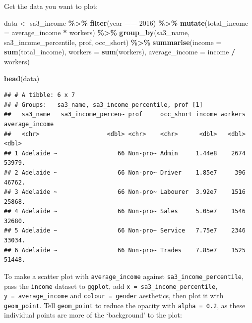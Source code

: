 \documentclass[
]{book}
\newenvironment{Shaded}{\begin{snugshade}}{\end{snugshade}}
\newcommand{\DataTypeTok}[1]{\textcolor[rgb]{0.13,0.29,0.53}{#1}}
\newcommand{\DecValTok}[1]{\textcolor[rgb]{0.00,0.00,0.81}{#1}}
\newcommand{\KeywordTok}[1]{\textcolor[rgb]{0.13,0.29,0.53}{\textbf{#1}}}
\newcommand{\NormalTok}[1]{#1}
\newcommand{\OperatorTok}[1]{\textcolor[rgb]{0.81,0.36,0.00}{\textbf{#1}}}
\newcommand{\StringTok}[1]{\textcolor[rgb]{0.31,0.60,0.02}{#1}}
\begin{document}
Get the data you want to plot:

\begin{Shaded}
\begin{Highlighting}[]
\NormalTok{data \textless{}{-}}\StringTok{ }\NormalTok{sa3\_income }\OperatorTok{\%\textgreater{}\%}\StringTok{ }
\StringTok{  }\KeywordTok{filter}\NormalTok{(year }\OperatorTok{==}\StringTok{ }\DecValTok{2016}\NormalTok{) }\OperatorTok{\%\textgreater{}\%}
\StringTok{  }\KeywordTok{mutate}\NormalTok{(}\DataTypeTok{total\_income =}\NormalTok{ average\_income }\OperatorTok{*}\StringTok{ }\NormalTok{workers) }\OperatorTok{\%\textgreater{}\%}\StringTok{ }
\StringTok{  }\KeywordTok{group\_by}\NormalTok{(sa3\_name, sa3\_income\_percentile, prof, occ\_short) }\OperatorTok{\%\textgreater{}\%}\StringTok{ }
\StringTok{  }\KeywordTok{summarise}\NormalTok{(}\DataTypeTok{income =} \KeywordTok{sum}\NormalTok{(total\_income),}
            \DataTypeTok{workers =} \KeywordTok{sum}\NormalTok{(workers),}
            \DataTypeTok{average\_income =}\NormalTok{ income }\OperatorTok{/}\StringTok{ }\NormalTok{workers)}

\KeywordTok{head}\NormalTok{(data)}
\end{Highlighting}
\end{Shaded}

\begin{verbatim}
## # A tibble: 6 x 7
## # Groups:   sa3_name, sa3_income_percentile, prof [1]
##   sa3_name   sa3_income_percen~ prof     occ_short income workers average_income
##   <chr>                   <dbl> <chr>    <chr>      <dbl>   <dbl>          <dbl>
## 1 Adelaide ~                 66 Non-pro~ Admin     1.44e8    2674         53979.
## 2 Adelaide ~                 66 Non-pro~ Driver    1.85e7     396         46762.
## 3 Adelaide ~                 66 Non-pro~ Labourer  3.92e7    1516         25868.
## 4 Adelaide ~                 66 Non-pro~ Sales     5.05e7    1546         32680.
## 5 Adelaide ~                 66 Non-pro~ Service   7.75e7    2346         33034.
## 6 Adelaide ~                 66 Non-pro~ Trades    7.85e7    1525         51448.
\end{verbatim}

To make a scatter plot with \texttt{average\_income} against \texttt{sa3\_income\_percentile}, pass the \texttt{income} dataset to \texttt{ggplot}, add \texttt{x\ =\ sa3\_income\_percentile}, \texttt{y\ =\ average\_income} and \texttt{colour\ =\ gender} aesthetics, then plot it with \texttt{geom\_point}. Tell \texttt{geom\_point} to reduce the opacity with \texttt{alpha\ =\ 0.2}, as these individual points are more of the `background' to the plot:
\end{document}
